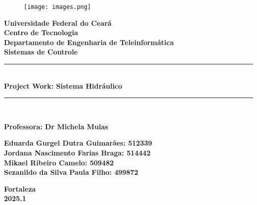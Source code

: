 \documentclass[12pt,a4]{article}
\begin{document}
\begin{titlepage}
\newcommand{\capaUniversidade}{Universidade Federal do Ceará}
\newcommand{\capaCentro}{Centro de Tecnologia}
\newcommand{\capaDepartamento}{Departamento de Engenharia de Teleinformática}
\newcommand{\capaAtividade}{Sistemas de Controle}
\newcommand{\capaTitulo}{Project Work: Sistema Hidráulico}
\newcommand{\capaProfessor}{Dr Michela Mulas}
\newcommand{\capaAutorA}{Eduarda Gurgel Dutra Guimarães}
\newcommand{\capaAutorB}{Sezanildo da Silva Paula Filho}
\newcommand{\capaAutorC}{Jordana Nascimento Farias Braga}
\newcommand{\capaAutorD}{Mikael Ribeiro Camelo}
\newcommand{\capaMatriculaA}{512339}
\newcommand{\capaMatriculaB}{499872}
\newcommand{\capaMatriculaC}{514442}
\newcommand{\capaMatriculaD}{509482}
\newcommand{\capaCidade}{Fortaleza}
\newcommand{\capaAno}{2025.1}
\newcommand{\Hrule}{\rule{\linewidth}{0.5mm}}

\center
\vspace*{-3.9cm}
\begin{figure}[H] 
    \centering
    \texttt{[image: images.png]} %
\end{figure}

\large


\textbf{\Large\capaUniversidade}\\
\textbf{\Large\capaCentro}\\
\textbf{\Large\capaDepartamento}\\
\vspace{5cm}
\textbf{\textbf{\Large\capaAtividade}}\\


\vspace{0.5 cm}
\Hrule\\[0.4cm ]
{\huge\textbf{\capaTitulo}}\\[0.25cm]
\Hrule \\[1.0cm]
\vspace{1.0cm}

\textbf{\large Professora: \capaProfessor}\\
\vspace{1.5cm}
\begin{flushleft}
\textbf{\capaAutorA: \capaMatriculaA} \\
\textbf{\capaAutorC: \capaMatriculaC} \\
\textbf{\capaAutorD: \capaMatriculaD} \\
\textbf{\capaAutorB: \capaMatriculaB} \\

\end{flushleft}

\vfill
\textbf{\large\capaCidade}\\ \textbf{\capaAno}\\

\end{titlepage}
\end{document}
